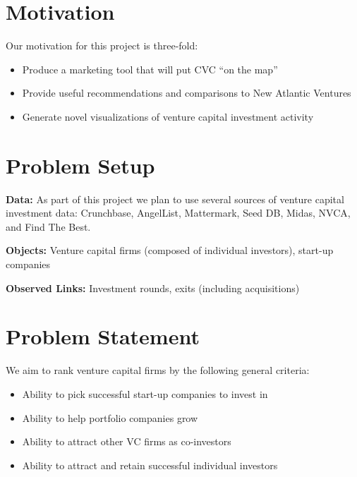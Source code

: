 \documentclass{article}
\begin{document}
 


\begin{abstract}
...
\end{abstract}

\vspace{-0.3in}


\section{Motivation}
Our motivation for this project is three-fold:
\begin{itemize}
\item{Produce a marketing tool that will put CVC ``on the map''}
\item{Provide useful recommendations and comparisons to New Atlantic Ventures}
\item{Generate novel visualizations of venture capital investment activity}
\end{itemize}


\section{Problem Setup}

{\bf Data:} As part of this project we plan to use several sources of venture capital investment data: Crunchbase, AngelList, Mattermark, Seed DB, Midas, NVCA, and Find The Best.

{\bf Objects:} Venture capital firms (composed of individual investors), start-up companies


{\bf Observed Links:} Investment rounds, exits (including acquisitions)

\section{Problem Statement}
We aim to rank venture capital firms by the following general criteria:
\begin{itemize}
\item{Ability to pick successful start-up companies to invest in}
\item{Ability to help portfolio companies grow}
\item{Ability to attract other VC firms as co-investors}
\item{Ability to attract and retain successful individual investors}
\end{itemize}
\end{document}
